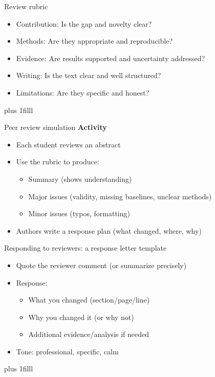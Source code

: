 \documentclass[aspectratio=169]{beamer}
\newcommand{\btVFill}{\vskip0pt plus 1filll}
\begin{document}
\begin{frame}{Review rubric}
  \begin{itemize}
    \item Contribution: Is the gap and novelty clear?
    \item Methods: Are they appropriate and reproducible?
    \item Evidence: Are results supported and uncertainty addressed?
    \item Writing: Is the text clear and well structured?
    \item Limitations: Are they specific and honest?
  \end{itemize}
\btVFill\end{frame}

\begin{frame}{Peer review simulation}
  \textbf{Activity}
  \begin{itemize}
    \item Each student reviews an abstract
    \item Use the rubric to produce:
      \begin{itemize}
        \item Summary (shows understanding)
        \item Major issues (validity, missing baselines, unclear methods)
        \item Minor issues (typos, formatting)
      \end{itemize}
    \item Authors write a response plan (what changed, where, why)
  \end{itemize}
\end{frame}

\begin{frame}{Responding to reviewers: a response letter template}
  \begin{itemize}
    \item Quote the reviewer comment (or summarize precisely)
    \item Response:
      \begin{itemize}
        \item What you changed (section/page/line)
        \item Why you changed it (or why not)
        \item Additional evidence/analysis if needed
      \end{itemize}
    \item Tone: professional, specific, calm
  \end{itemize}
\btVFill
\end{frame}
\end{document}
